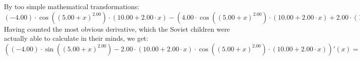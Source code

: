 \documentclass{article}
\begin{document}
\newline
By too simple mathematical transformations:
 ${{\left({-4.00}\right) \cdot { \cos {\left({\left({{5.00} + {x}}\right) ^ {2.00}}\right)}  \cdot \left({{10.00} + {{2.00} \cdot {x}}}\right)}} - \left({{{4.00} \cdot { \cos {\left({\left({{5.00} + {x}}\right) ^ {2.00}}\right)}  \cdot \left({{10.00} + {{2.00} \cdot {x}}}\right)}} + {{2.00} \cdot {\left({{10.00} + {{2.00} \cdot {x}}}\right) \cdot \left({{\left({-1.00}\right) \cdot {\left({{10.00} + {{2.00} \cdot {x}}}\right) \cdot {\left({{10.00} + {{2.00} \cdot {x}}}\right) \cdot  \sin {\left({\left({{5.00} + {x}}\right) ^ {2.00}}\right)} }}} + {{2.00} \cdot  \cos {\left({\left({{5.00} + {x}}\right) ^ {2.00}}\right)} }}\right)}}}\right)} = {{\left({-4.00}\right) \cdot { \cos {\left({\left({{5.00} + {x}}\right) ^ {2.00}}\right)}  \cdot \left({{10.00} + {{2.00} \cdot {x}}}\right)}} + {{\left({-4.00}\right) \cdot { \cos {\left({\left({{5.00} + {x}}\right) ^ {2.00}}\right)}  \cdot \left({{10.00} + {{2.00} \cdot {x}}}\right)}} - {{2.00} \cdot {\left({{10.00} + {{2.00} \cdot {x}}}\right) \cdot \left({{\left({-1.00}\right) \cdot {\left({{10.00} + {{2.00} \cdot {x}}}\right) \cdot {\left({{10.00} + {{2.00} \cdot {x}}}\right) \cdot  \sin {\left({\left({{5.00} + {x}}\right) ^ {2.00}}\right)} }}} + {{2.00} \cdot  \cos {\left({\left({{5.00} + {x}}\right) ^ {2.00}}\right)} }}\right)}}}}$ 
 \newline
 \newline 
Having counted the most obvious derivative, which the Soviet children were actually able to calculate in their minds, we get:
$({{\left({-4.00}\right) \cdot  \sin {\left({\left({{5.00} + {x}}\right) ^ {2.00}}\right)} } - {{2.00} \cdot {\left({{10.00} + {{2.00} \cdot {x}}}\right) \cdot { \cos {\left({\left({{5.00} + {x}}\right) ^ {2.00}}\right)}  \cdot \left({{10.00} + {{2.00} \cdot {x}}}\right)}}}})'(x) = {{\left({-4.00}\right) \cdot { \cos {\left({\left({{5.00} + {x}}\right) ^ {2.00}}\right)}  \cdot \left({{10.00} + {{2.00} \cdot {x}}}\right)}} + {{\left({-4.00}\right) \cdot { \cos {\left({\left({{5.00} + {x}}\right) ^ {2.00}}\right)}  \cdot \left({{10.00} + {{2.00} \cdot {x}}}\right)}} - {{2.00} \cdot {\left({{10.00} + {{2.00} \cdot {x}}}\right) \cdot \left({{\left({-1.00}\right) \cdot {\left({{10.00} + {{2.00} \cdot {x}}}\right) \cdot {\left({{10.00} + {{2.00} \cdot {x}}}\right) \cdot  \sin {\left({\left({{5.00} + {x}}\right) ^ {2.00}}\right)} }}} + {{2.00} \cdot  \cos {\left({\left({{5.00} + {x}}\right) ^ {2.00}}\right)} }}\right)}}}}$\newline
\newline
\end{document}
